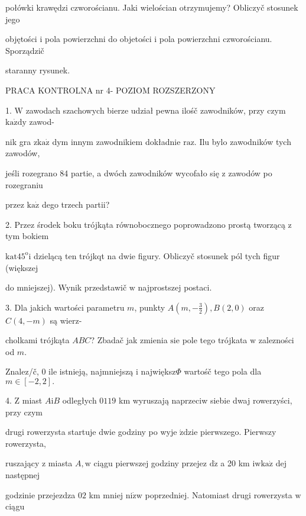 \documentclass[a4paper,12pt]{article}
\begin{document}
połówki krawędzi czworościanu. Jaki wielościan otrzymujemy? Obliczyč stosunek jego

objętości $\mathrm{i}$ pola powierzchni do objetości $\mathrm{i}$ pola powierzchni czworościanu. Sporządzič

staranny rysunek.




PRACA KONTROLNA nr 4- POZIOM ROZSZERZONY

1. $\mathrm{W}$ zawodach szachowych bierze udział pewna ilośč zawodników, przy czym $\mathrm{k}\mathrm{a}\dot{\mathrm{z}}\mathrm{d}\mathrm{y}$ zawod-

nik gra $\mathrm{z}\mathrm{k}\mathrm{a}\dot{\mathrm{z}}$ dym innym zawodnikiem dokładnie $\mathrm{r}\mathrm{a}\mathrm{z}$. Ilu bylo zawodników tych zawodów,

jeśli rozegrano 84 partie, a dwóch zawodników wycofało się $\mathrm{z}$ zawodów po rozegraniu

przez $\mathrm{k}\mathrm{a}\dot{\mathrm{z}}$ dego trzech partii?

2. Przez środek boku trójkąta równobocznego poprowadzono prostą tworzącą $\mathrm{z}$ tym bokiem

$\mathrm{k}\mathrm{a}\mathrm{t}45^{\mathrm{o}}\mathrm{i}$ dzielącą ten trójkqt na dwie figury. Obliczyč stosunek pól tych figur (większej

do mniejszej). Wynik przedstawič $\mathrm{w}$ najprostszej postaci.

3. Dla jakich wartości parametru $m$, punkty $A(m,-\displaystyle \frac{3}{2}), B(2,0)$ oraz $C(4,-m)$ są wierz-

cholkami trójkąta $ABC$? Zbadač jak zmienia $\mathrm{s}\mathrm{i}\mathrm{e}$ pole tego trójkata $\mathrm{w}$ zalezności od $m.$

Znalez/č, $0$ ile istnieją, najmniejszą $\mathrm{i}$ największ$\Phi$ wartośč tego pola dla $m\in[-2,2].$

4. $\mathrm{Z}$ miast $A\mathrm{i}B$ odległych $0119$ km wyruszają naprzeciw siebie dwaj rowerzyści, przy czym

drugi rowerzysta startuje dwie godziny po wyje $\acute{\mathrm{z}}\mathrm{d}\mathrm{z}\mathrm{i}\mathrm{e}$ pierwszego. Pierwszy rowerzysta,

ruszający $\mathrm{z}$ miasta $A, \mathrm{w}$ ciągu pierwszej godziny przejez $\mathrm{d}\dot{\mathrm{z}}$ a 20 km $\mathrm{i}\mathrm{w}\mathrm{k}\mathrm{a}\dot{\mathrm{z}}$ dej następnej

godzinie przejezdza $02$ km mniej $\mathrm{n}\mathrm{i}\dot{\mathrm{z}}\mathrm{w}$ poprzedniej. Natomiast drugi rowerzysta $\mathrm{w}$ ciągu
\end{document}
